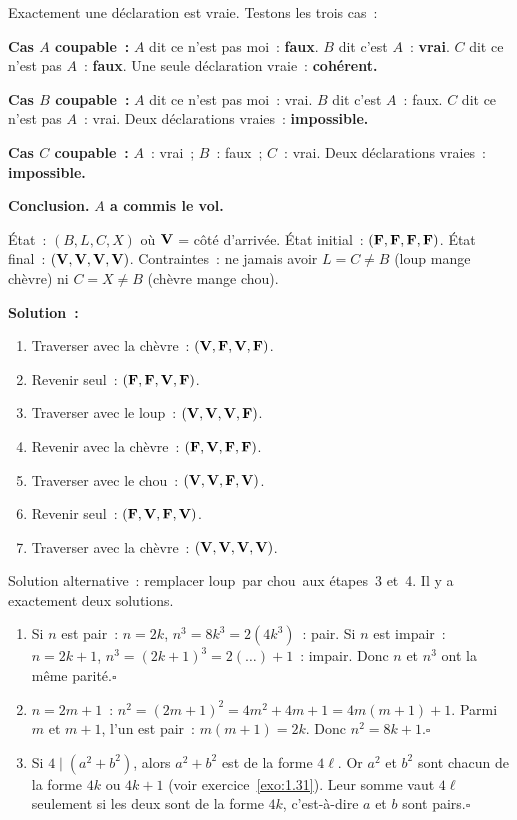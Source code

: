 
Exactement une d\'eclaration est vraie. Testons les trois cas~:

\textbf{Cas $A$ coupable~:} $A$ dit \og ce n'est pas moi\fg~: \textbf{faux}.
$B$ dit \og c'est $A$\fg~: \textbf{vrai}.
$C$ dit \og ce n'est pas $A$\fg~: \textbf{faux}.
Une seule d\'eclaration vraie~: \textbf{coh\'erent.}

\textbf{Cas $B$ coupable~:} $A$ dit \og ce n'est pas moi\fg~: vrai.
$B$ dit \og c'est $A$\fg~: faux.
$C$ dit \og ce n'est pas $A$\fg~: vrai.
Deux d\'eclarations vraies~: \textbf{impossible.}

\textbf{Cas $C$ coupable~:} $A$~: vrai~; $B$~: faux~; $C$~: vrai.
Deux d\'eclarations vraies~: \textbf{impossible.}

\textbf{Conclusion.} \textbf{$A$ a commis le vol.}


\'Etat~: $(B,L,C,X)$ o\`u $\textbf{V}$ = c\^ot\'e d'arriv\'ee.
\'Etat initial~: $(\textbf{F},\textbf{F},\textbf{F},\textbf{F})$.
\'Etat final~: $(\textbf{V},\textbf{V},\textbf{V},\textbf{V})$.
Contraintes~: ne jamais avoir $L=C\ne B$ (loup mange ch\`evre)
ni $C=X\ne B$ (ch\`evre mange chou).

\textbf{Solution~:}
\begin{enumerate}
  \item Traverser avec la ch\`evre~: $(\textbf{V},\textbf{F},\textbf{V},\textbf{F})$.
  \item Revenir seul~: $(\textbf{F},\textbf{F},\textbf{V},\textbf{F})$.
  \item Traverser avec le loup~: $(\textbf{V},\textbf{V},\textbf{V},\textbf{F})$.
  \item Revenir avec la ch\`evre~: $(\textbf{F},\textbf{V},\textbf{F},\textbf{F})$.
  \item Traverser avec le chou~: $(\textbf{V},\textbf{V},\textbf{F},\textbf{V})$.
  \item Revenir seul~: $(\textbf{F},\textbf{V},\textbf{F},\textbf{V})$.
  \item Traverser avec la ch\`evre~: $(\textbf{V},\textbf{V},\textbf{V},\textbf{V})$.
\end{enumerate}
Solution alternative~: remplacer \og loup\fg\ par \og chou\fg\ aux \'etapes~3 et~4.
Il y a exactement deux solutions.


\begin{enumerate}
  \item Si $n$ est pair~: $n=2k$, $n^3=8k^3=2(4k^3)$~: pair.
        Si $n$ est impair~: $n=2k+1$, $n^3=(2k+1)^3=2(\ldots)+1$~: impair.
        Donc $n$ et $n^3$ ont la m\^eme parit\'e.\hfill$\square$
  \item $n=2m+1$~: $n^2=(2m+1)^2=4m^2+4m+1=4m(m+1)+1$.
        Parmi $m$ et $m+1$, l'un est pair~: $m(m+1)=2k$.
        Donc $n^2=8k+1$.\hfill$\square$
  \item Si $4\mid(a^2+b^2)$, alors $a^2+b^2$ est de la forme $4\ell$.
        Or $a^2$ et $b^2$ sont chacun de la forme $4k$ ou $4k+1$
        (voir exercice~\ref{exo:1.31}). Leur somme vaut $4\ell$ seulement si
        les deux sont de la forme $4k$, c'est-\`a-dire $a$ et $b$ sont pairs.\hfill$\square$
\end{enumerate}

